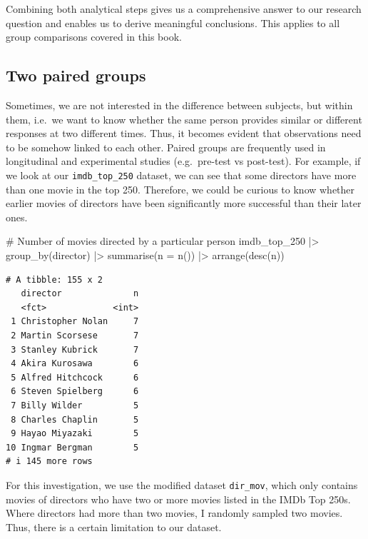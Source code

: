 \documentclass[
  letterpaper,
]{krantz}
\makeatletter
\newenvironment{Shaded}{\begin{snugshade}}{\end{snugshade}}
\newcommand{\AttributeTok}[1]{\textcolor[rgb]{0.40,0.45,0.13}{#1}}
\newcommand{\CommentTok}[1]{\textcolor[rgb]{0.37,0.37,0.37}{#1}}
\newcommand{\FunctionTok}[1]{\textcolor[rgb]{0.28,0.35,0.67}{#1}}
\newcommand{\NormalTok}[1]{\textcolor[rgb]{0.00,0.23,0.31}{#1}}
\newcommand{\SpecialCharTok}[1]{\textcolor[rgb]{0.37,0.37,0.37}{#1}}
\newenvironment{kframe}{%
\medskip{}
\setlength{\fboxsep}{.8em}
 \def\at@end@of@kframe{}%
 \ifinner\ifhmode%
  \def\at@end@of@kframe{\end{minipage}}%
  \begin{minipage}{\columnwidth}%
 \fi\fi%
 \def\FrameCommand##1{\hskip\@totalleftmargin \hskip-\fboxsep
 \colorbox{shadecolor}{##1}\hskip-\fboxsep
     \hskip-\linewidth \hskip-\@totalleftmargin \hskip\columnwidth}%
 \MakeFramed {\advance\hsize-\width
   \@totalleftmargin\z@ \linewidth\hsize
   \@setminipage}}%
 {\par\unskip\endMakeFramed%
 \at@end@of@kframe}
\renewenvironment{Shaded}{\begin{kframe}}{\end{kframe}}
\makeatother
\begin{document}
Combining both analytical steps gives us a comprehensive answer to our
research question and enables us to derive meaningful conclusions. This
applies to all group comparisons covered in this book.

\subsection{Two paired groups}\label{sec-two-paired-groups}

Sometimes, we are not interested in the difference between subjects, but
within them, i.e.~we want to know whether the same person provides
similar or different responses at two different times. Thus, it becomes
evident that observations need to be somehow linked to each other.
Paired groups are frequently used in longitudinal and experimental
studies (e.g.~pre-test vs post-test). For example, if we look at our
\texttt{imdb\_top\_250} dataset, we can see that some directors have
more than one movie in the top 250. Therefore, we could be curious to
know whether earlier movies of directors have been significantly more
successful than their later ones.

\begin{Shaded}
\begin{Highlighting}[]
\CommentTok{\# Number of movies directed by a particular person}
\NormalTok{imdb\_top\_250 }\SpecialCharTok{|\textgreater{}}
  \FunctionTok{group\_by}\NormalTok{(director) }\SpecialCharTok{|\textgreater{}}
  \FunctionTok{summarise}\NormalTok{(}\AttributeTok{n =} \FunctionTok{n}\NormalTok{()) }\SpecialCharTok{|\textgreater{}}
  \FunctionTok{arrange}\NormalTok{(}\FunctionTok{desc}\NormalTok{(n))}
\end{Highlighting}
\end{Shaded}

\begin{verbatim}
# A tibble: 155 x 2
   director              n
   <fct>             <int>
 1 Christopher Nolan     7
 2 Martin Scorsese       7
 3 Stanley Kubrick       7
 4 Akira Kurosawa        6
 5 Alfred Hitchcock      6
 6 Steven Spielberg      6
 7 Billy Wilder          5
 8 Charles Chaplin       5
 9 Hayao Miyazaki        5
10 Ingmar Bergman        5
# i 145 more rows
\end{verbatim}

For this investigation, we use the modified dataset \texttt{dir\_mov},
which only contains movies of directors who have two or more movies
listed in the IMDb Top 250s. Where directors had more than two movies, I
randomly sampled two movies. Thus, there is a certain limitation to our
dataset.
\end{document}
